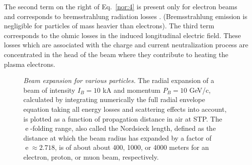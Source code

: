 \documentclass [12pt,a4paper,     ]{report} %
\newcommand{\e  }{\operatorname{e}}   %
\begin{document}
  The second term on the right of Eq.~\eqref{nor:4} is present only for electron beams and corresponds to bremsstrahlung radiation losses \cite[p.50]{ROSSI1952-}.  (Bremsstrahlung emission is negligible for particles of mass heavier than electrons).  The third term corresponds to the ohmic losses in the induced longitudinal electric field.  These losses which are associated with the charge and current neutralization process are concentrated in the head of the beam where they contribute to heating the plasma electrons.

%
\begin{figure}  
\begin{center}
\caption[Beam expansion for various particles]{\emph{Beam expansion for various particles.} The radial expansion of a beam of intensity $I_B=10$ kA and momentum $P_B=10$ GeV/c, calculated by integrating numerically the full radial envelope equation taking all energy losses and scattering effects into account, is plotted as a function of propagation distance in air at STP.  The $\e$-folding range, also called the Nordsieck length, defined as the distance at which the beam radius has expanded by a factor of $\e \approx 2.718$, is of about about 400, 1000, or 4000 meters for an electron, proton, or muon beam, respectively. \label{fig:exp}}
\end{center}
\end{figure}
%
\end{document}
